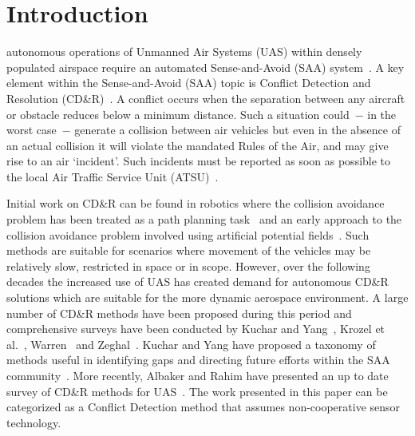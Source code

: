 \documentclass[journal]{IEEEtran}
\begin{document}
\section{Introduction}
 autonomous operations of Unmanned Air Systems (UAS) within densely populated airspace require an automated Sense-and-Avoid (SAA) system~\cite{angelov2012sense}. A key element within the Sense-and-Avoid (SAA) topic is Conflict Detection and Resolution (CD\&R)~\cite{angelov2012sense}. A conflict occurs when the separation between any aircraft or obstacle reduces below a minimum distance. Such a situation could~$-$ in the worst case~$-$ generate a collision between air vehicles but even in the absence of an actual collision it will violate the mandated Rules of the Air, and may give rise to an air ‘incident’. Such incidents must be reported as soon as possible to the local Air Traffic Service Unit (ATSU)~\cite{ICAOannex13}. 

Initial work on CD\&R can be found in robotics where the collision avoidance problem has been treated as a path planning task~\cite{moravec1980obstacle} and an early approach to the collision avoidance problem involved using artificial potential fields~\cite{khatib1986real}. Such methods are suitable for scenarios where movement of the vehicles may be relatively slow, restricted in space or in scope. However, over the following decades the increased use of UAS has created demand for autonomous CD\&R solutions which are suitable for the more dynamic aerospace environment. A large number of CD\&R methods have been proposed during this period and comprehensive surveys have been conducted by Kuchar and Yang~\cite{kuchar2000review}, Krozel et al.~\cite{krozel1997conflict}, Warren~\cite{warren1997medium} and Zeghal~\cite{zeghal1998review}. Kuchar and Yang have proposed a taxonomy of methods useful in identifying gaps and directing future efforts within the SAA community~\cite{kuchar2000review}. More recently, Albaker and Rahim have presented an up to date survey of CD\&R methods for UAS~\cite{albaker2009survey}. The work presented in this paper can be categorized as a Conflict Detection method that assumes non-cooperative sensor technology.
\end{document}

